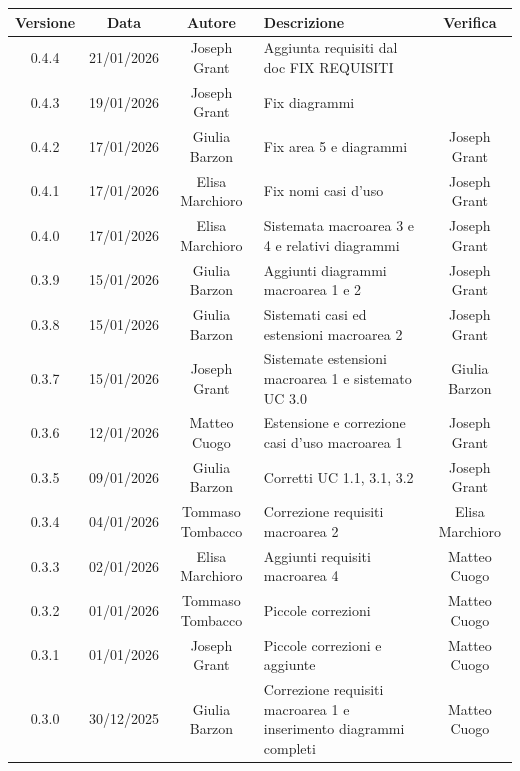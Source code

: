 \documentclass[11pt,a4paper]{article}
\begin{document}
\begin{table}[H]
    \centering
    \begin{tabular}{|c|c|c|>{\raggedright\arraybackslash}p{}|c|}
        \hline
        \textbf{Versione} & \textbf{Data} & \textbf{Autore} & \textbf{Descrizione} & \textbf{Verifica} \\
        \hline
        0.4.4 & 21/01/2026 & Joseph Grant & Aggiunta requisiti dal doc FIX REQUISITI &  \\
        \hline
        0.4.3 & 19/01/2026 & Joseph Grant & Fix diagrammi &  \\
        \hline
        0.4.2 & 17/01/2026 & Giulia Barzon & Fix area 5 e diagrammi & Joseph Grant \\
        \hline
        0.4.1 & 17/01/2026 & Elisa Marchioro & Fix nomi casi d'uso & Joseph Grant \\
        \hline
        0.4.0 & 17/01/2026 & Elisa Marchioro & Sistemata macroarea 3 e 4 e relativi diagrammi & Joseph Grant \\
        \hline
        0.3.9 & 15/01/2026 & Giulia Barzon & Aggiunti diagrammi macroarea 1 e 2 & Joseph Grant \\
        \hline
        0.3.8 & 15/01/2026 & Giulia Barzon & Sistemati casi ed estensioni macroarea 2 & Joseph Grant \\
        \hline
        0.3.7 & 15/01/2026 & Joseph Grant & Sistemate estensioni macroarea 1 e sistemato UC 3.0 & Giulia Barzon\\
        \hline
        0.3.6 & 12/01/2026 & Matteo Cuogo & Estensione e correzione casi d'uso macroarea 1 & Joseph Grant\\
        \hline
        0.3.5 & 09/01/2026 & Giulia Barzon & Corretti UC 1.1, 3.1, 3.2 & Joseph Grant\\
        \hline
        0.3.4 & 04/01/2026 & Tommaso Tombacco & Correzione requisiti macroarea 2 & Elisa Marchioro\\
        \hline
        0.3.3 & 02/01/2026 & Elisa Marchioro & Aggiunti requisiti macroarea 4 &  Matteo Cuogo\\
        \hline
        0.3.2 & 01/01/2026 & Tommaso Tombacco & Piccole correzioni & Matteo Cuogo\\
        \hline
        0.3.1 & 01/01/2026 & Joseph Grant & Piccole correzioni e aggiunte &  Matteo Cuogo\\
        \hline
        0.3.0 & 30/12/2025 & Giulia Barzon & Correzione requisiti macroarea 1 e inserimento diagrammi completi & Matteo Cuogo \\

\end{tabular}
\end{table}
\end{document}
